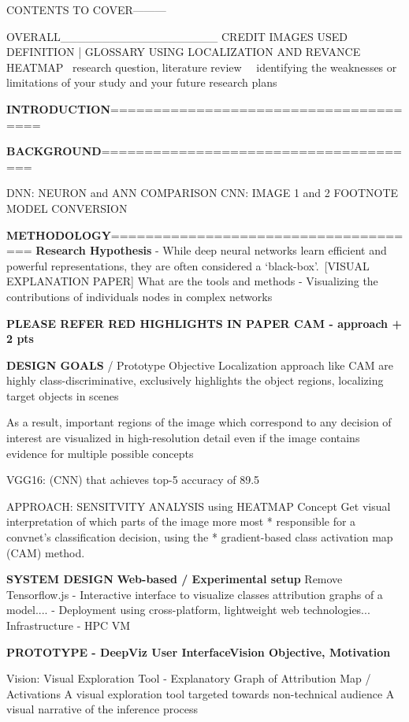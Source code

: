 CONTENTS TO COVER---------

OVERALL___________________
CREDIT IMAGES USED
DEFINITION | GLOSSARY
USING LOCALIZATION AND REVANCE HEATMAP
 research question, literature review 
 identifying the weaknesses or limitations of your study and your future research plans

\textbf{INTRODUCTION}======================================

\textbf{BACKGROUND}======================================

DNN: NEURON  and ANN COMPARISON
CNN: IMAGE 1 and 2 FOOTNOTE
MODEL CONVERSION

\textbf{METHODOLOGY}=====================================
\textbf{Research Hypothesis}
- While deep neural networks learn efficient and powerful representations, they are often considered a ‘black-box’. [VISUAL EXPLANATION PAPER] What are the tools and methods 
- Visualizing the contributions of individuals nodes in complex networks

\textbf{PLEASE REFER RED HIGHLIGHTS IN PAPER CAM - approach + 2 pts}

\textbf{DESIGN GOALS} / Prototype Objective
Localization approach like CAM are highly class-discriminative, exclusively highlights the object regions, localizing target objects in scenes

As a result, important regions of the image which correspond
to any decision of interest are visualized in high-resolution
detail even if the image contains evidence for multiple possible concepts

VGG16: (CNN) that achieves top-5 accuracy of 89.5%

APPROACH: SENSITVITY ANALYSIS using HEATMAP Concept
Get visual interpretation of which parts of the image more most
 *    responsible for a convnet's classification decision, using the
 *    gradient-based class activation map (CAM) method.
 
 \textbf{SYSTEM DESIGN}
 \textbf{Web-based / Experimental setup}
 Remove Tensorflow.js
 - Interactive interface to visualize classes attribution graphs of a model....
 - Deployment using cross-platform, lightweight web technologies...
Infrastructure - HPC VM

 \textbf{PROTOTYPE - DeepViz User InterfaceVision Objective, Motivation}

Vision:  Visual Exploration Tool - Explanatory Graph of Attribution Map / Activations
A visual exploration tool targeted towards non-technical audience
A visual narrative of the inference process

